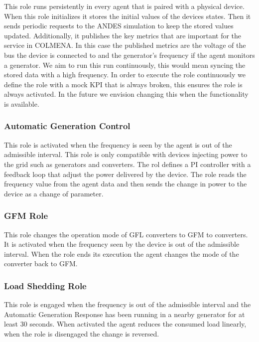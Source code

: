 \documentclass{article}
\begin{document}
This role runs persistently in every agent that is paired with a physical device. When this role initializes it stores the initial values of the devices states. Then it sends periodic requests to the ANDES simulation to keep the stored values updated. Additionally, it publishes the key metrics that are important for the service in COLMENA. In this case the published metrics are the voltage of the bus the device is connected to and the generator's frequency if the agent monitors a generator. We aim to run this run continuously, this would mean syncing the stored data with a high frequency. In order to execute the role continuously we define the role with a mock KPI that is always broken, this ensures the role is always activated. In the future we envision changing this when the functionality is available.   

\subsubsection*{Automatic Generation Control}

This role is activated when the frequency is seen by the agent is out of the admissible interval. This role is only compatible with devices injecting power to the grid such as generators and converters. The rol defines a PI controller with a feedback loop that adjust the power delivered by the device. The role reads the frequency value from the agent data and then sends the change in power to the device as a change of parameter.

\subsubsection*{GFM Role}

This role changes the operation mode of GFL converters to GFM to converters. It is activated when the frequency seen by the device is out of the admissible interval. When the role ends its execution the agent changes the mode of the converter back to GFM.

\subsubsection*{Load Shedding Role}

This role is engaged when the frequency is out of the admissible interval and the Automatic Generation Response has been running in a nearby generator for at least 30 seconds. When activated the agent reduces the consumed load linearly, when the role is disengaged the change is reversed.
\end{document}
